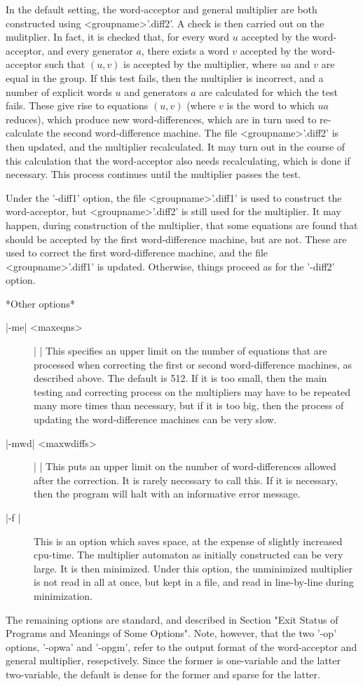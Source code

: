In the default setting, the word-acceptor and general multiplier are both
constructed using <groupname>'.diff2'. A check is then carried out on the
mulitplier. In fact, it is checked that, for every word $u$ accepted by
the word-acceptor, and every generator $a$, there exists a word $v$
accepted by the word-acceptor such that $(u,v)$ is accepted by the multiplier,
where $ua$ and $v$ are equal in the group.
If this test fails, then the multiplier is incorrect, and a number of explicit
words $u$ and generators $a$ are calculated for which the test fails.
These give rise to equations $(u,v)$ (where $v$ is the word to which
$ua$ reduces), which produce new word-differences, which are in turn used
to re-calculate the second word-difference machine. The file
<groupname>'.diff2' is then updated, and the multiplier recalculated. It
may turn out in the course of this calculation that the word-acceptor also
needs recalculating, which is done if necessary. This process continues
until the multiplier passes the test.

Under the '-diff1' option, the file <groupname>'.diff1' is used to construct
the word-acceptor, but <groupname>'.diff2' is still used for the multiplier.
It may happen, during construction of the multiplier, that some equations
are found that should be accepted by the first word-difference machine, but
are not. These are used to correct the first word-difference machine, and
the file <groupname>'.diff1' is updated. Otherwise, things proceed as for the
'-diff2' option.

*Other options*
\begin{description}
\item[|-me| <maxeqns>] | |\newline
This specifies an upper limit on the number of equations that are processed
when correcting the first or second word-difference machines, as described
above. The default is 512. If it is too small, then the main testing and
correcting process on the multipliers may have to be repeated many more times
than necessary, but if it is too big, then the process of updating the
word-difference machines can be very slow.
\item[|-mwd| <maxwdiffs>] | |\newline
This puts an upper limit on the number of word-differences allowed after the
correction. It is rarely necessary to call this. If it is necessary, then the
program will halt with an informative error message.
\item[|-f |]
This is an option which saves space, at the expense of slightly increased
cpu-time. The multiplier automaton as initially constructed can be very
large. It is then minimized. Under this option, the unminimized multiplier
is not read in all at once, but kept in a file, and read in line-by-line
during minimization.
\end{description}
The remaining options are standard, and described in Section
"Exit Status of Programs and Meanings of Some Options".
Note, however, that the two '-op' options,
'-opwa' and '-opgm', refer to the output format of the word-acceptor and
general multiplier, resepctively. Since the former is one-variable and
the latter two-variable, the default is dense for the former and sparse
for the latter.

